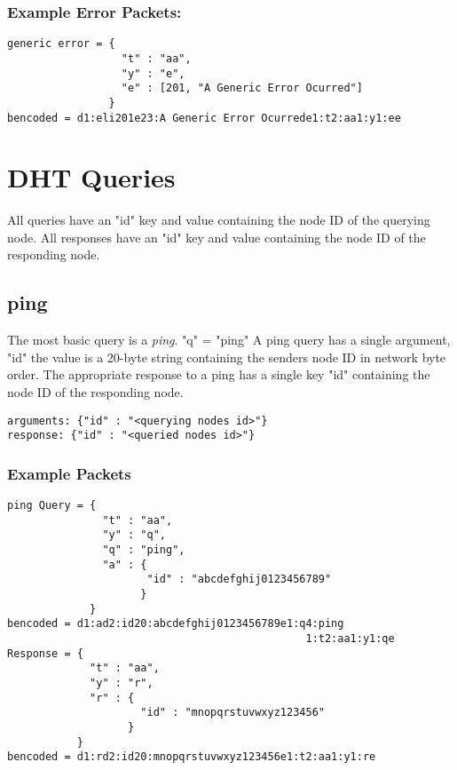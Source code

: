\documentclass{article}
\begin{document}
{\subsubsection {Example Error Packets:}}

\begin{verbatim}
generic error = {
                  "t" : "aa",
                  "y" : "e",
                  "e" : [201, "A Generic Error Ocurred"]
                }
bencoded = d1:eli201e23:A Generic Error Ocurrede1:t2:aa1:y1:ee
\end{verbatim}


{\section {DHT Queries}}

All queries have an "id" key and value containing the node ID of the querying node. All responses have an "id" key and value containing the node ID of the responding node.

{\subsection {ping}}
The most basic query is a {\em ping}. "q" = "ping" A ping query has a single argument, "id" the value is a 20-byte string containing the senders node ID in network byte order. The appropriate response to a ping has a single key "id" containing the node ID of the responding node.

\begin{verbatim}
arguments: {"id" : "<querying nodes id>"}
response: {"id" : "<queried nodes id>"}
\end{verbatim}

{\subsubsection {Example Packets}}

\begin{verbatim}
ping Query = {
               "t" : "aa",
               "y" : "q",
               "q" : "ping",
               "a" : {
                      "id" : "abcdefghij0123456789"
                     }
             }
bencoded = d1:ad2:id20:abcdefghij0123456789e1:q4:ping
                                               1:t2:aa1:y1:qe
Response = {
             "t" : "aa",
             "y" : "r",
             "r" : {
                     "id" : "mnopqrstuvwxyz123456"
                   }
           }
bencoded = d1:rd2:id20:mnopqrstuvwxyz123456e1:t2:aa1:y1:re
\end{verbatim}
\end{document}
